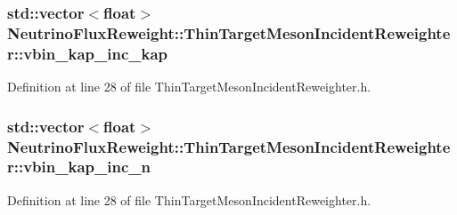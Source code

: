 \hypertarget{class_neutrino_flux_reweight_1_1_thin_target_meson_incident_reweighter_a684df85cab4b7042cb79135fc7ceb6ae}{
\subsubsection[{vbin\-\_\-kap\-\_\-inc\-\_\-kap}]{\setlength{\rightskip}{0pt plus 5cm}std\-::vector$<$float$>$ Neutrino\-Flux\-Reweight\-::\-Thin\-Target\-Meson\-Incident\-Reweighter\-::vbin\-\_\-kap\-\_\-inc\-\_\-kap}}\label{class_neutrino_flux_reweight_1_1_thin_target_meson_incident_reweighter_a684df85cab4b7042cb79135fc7ceb6ae}


Definition at line 28 of file Thin\-Target\-Meson\-Incident\-Reweighter.\-h.

\hypertarget{class_neutrino_flux_reweight_1_1_thin_target_meson_incident_reweighter_a2922c8a50ce538b4abea1c364d6adc9b}{
\subsubsection[{vbin\-\_\-kap\-\_\-inc\-\_\-n}]{\setlength{\rightskip}{0pt plus 5cm}std\-::vector$<$float$>$ Neutrino\-Flux\-Reweight\-::\-Thin\-Target\-Meson\-Incident\-Reweighter\-::vbin\-\_\-kap\-\_\-inc\-\_\-n}}\label{class_neutrino_flux_reweight_1_1_thin_target_meson_incident_reweighter_a2922c8a50ce538b4abea1c364d6adc9b}


Definition at line 28 of file Thin\-Target\-Meson\-Incident\-Reweighter.\-h.

